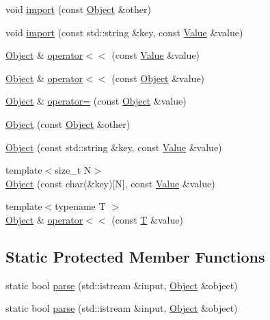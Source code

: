 \begin{DoxyCompactItemize}
\item 
void \hyperlink{classjsonxx_1_1_object_a8edcd474c4d95435f140344e4315c532}{import} (const \hyperlink{classjsonxx_1_1_object}{Object} \&other)
\item 
void \hyperlink{classjsonxx_1_1_object_aeb845054d8332110e5eb220ba0da5b36}{import} (const std\+::string \&key, const \hyperlink{classjsonxx_1_1_value}{Value} \&value)
\item 
\hyperlink{classjsonxx_1_1_object}{Object} \& \hyperlink{classjsonxx_1_1_object_a7e543a99c644a2071e18fd4248d00f89}{operator$<$$<$} (const \hyperlink{classjsonxx_1_1_value}{Value} \&value)
\item 
\hyperlink{classjsonxx_1_1_object}{Object} \& \hyperlink{classjsonxx_1_1_object_a6627f50e8c19495cd9d024f1e99289ee}{operator$<$$<$} (const \hyperlink{classjsonxx_1_1_object}{Object} \&value)
\item 
\hyperlink{classjsonxx_1_1_object}{Object} \& \hyperlink{classjsonxx_1_1_object_a08589383b82f320c4a0daf46b3fe1a03}{operator=} (const \hyperlink{classjsonxx_1_1_object}{Object} \&value)
\item 
\hyperlink{classjsonxx_1_1_object_ae0ccdde1acc4a57262304a2d2f6dcd3f}{Object} (const \hyperlink{classjsonxx_1_1_object}{Object} \&other)
\item 
\hyperlink{classjsonxx_1_1_object_adffab98b45e7b85a84634c2ddb50978c}{Object} (const std\+::string \&key, const \hyperlink{classjsonxx_1_1_value}{Value} \&value)
\item 
{\footnotesize template$<$size\+\_\+t N$>$ }\\\hyperlink{classjsonxx_1_1_object_a31c9f8a65e7a8a6f7569edb7e626efc5}{Object} (const char(\&key)\mbox{[}N\mbox{]}, const \hyperlink{classjsonxx_1_1_value}{Value} \&value)
\item 
{\footnotesize template$<$typename T $>$ }\\\hyperlink{classjsonxx_1_1_object}{Object} \& \hyperlink{classjsonxx_1_1_object_ac3f753909eae006a9cafa7655c397a26}{operator$<$$<$} (const \hyperlink{http__parser_8c_ad24d0de3f597ca60dd95c4bc59c2ff73}{T} \&value)
\end{DoxyCompactItemize}
\subsection*{Static Protected Member Functions}
\begin{DoxyCompactItemize}
\item 
static bool \hyperlink{classjsonxx_1_1_object_aee66a6d70a66687907ca26df9130b465}{parse} (std\+::istream \&input, \hyperlink{classjsonxx_1_1_object}{Object} \&object)
\item 
static bool \hyperlink{classjsonxx_1_1_object_a0a013471a157812acfc5c6a39782319b}{parse} (std\+::istream \&input, \hyperlink{classjsonxx_1_1_object}{Object} \&object)
\end{DoxyCompactItemize}
